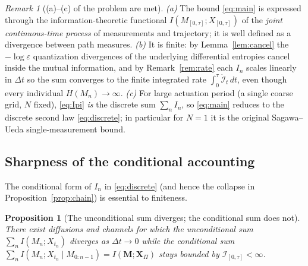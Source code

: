 \documentclass{amsart}
\newtheorem{proposition}{Proposition}
\theoremstyle{definition}
\theoremstyle{remark}
\newtheorem{remark}{Remark}
\begin{document}
\begin{remark}[(a)--(c) of the problem are met]\label{rem:abc}
\emph{(a)} The bound \eqref{eq:main} is expressed through the
information-theoretic functional $I(M_{[0,\tau]};X_{[0,\tau]})$ of the
\emph{joint continuous-time process} of measurements and trajectory; it
is well defined as a divergence between path measures.
\emph{(b)} It is finite: by Lemma~\ref{lem:cancel} the
$-\log\varepsilon$ quantization divergences of the underlying
differential entropies cancel inside the mutual information, and by
Remark~\ref{rem:rate} each $I_n$ scales linearly in $\Delta t$ so the
sum converges to the finite integrated rate
$\int_0^\tau\dot{\mathcal I}_t\,dt$, even though every individual
$H(M_n)\to\infty$. \emph{(c)} For large actuation period (a single
coarse grid, $N$ fixed), \eqref{eq:Ipi} \emph{is} the discrete sum
$\sum_n I_n$, so \eqref{eq:main} reduces to the discrete second law
\eqref{eq:discrete}; in particular for $N=1$ it is the original
Sagawa--Ueda single-measurement bound.
\end{remark}

\subsection{Sharpness of the conditional accounting}
The conditional form of $I_n$ in \eqref{eq:discrete} (and hence the
collapse in Proposition~\ref{prop:chain}) is essential to finiteness.

\begin{proposition}[The unconditional sum diverges; the conditional sum
does not]\label{prop:sharp}
There exist diffusions and channels for which the unconditional sum
$\sum_n I(M_n;X_{t_n})$ diverges as $\Delta t\to0$ while the conditional
sum $\sum_n I(M_n;X_{t_n}\mid M_{0:n-1})=I(\mathbf M;\mathbf X_\Pi)$
stays bounded by $\mathcal I_{[0,\tau]}<\infty$.
\end{proposition}
\end{document}
